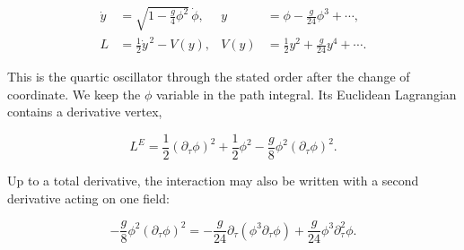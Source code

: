 \begin{equation}
 \begin{aligned}
 \dot y&=\sqrt{1-\frac{g}{4}\phi^2}\,\dot\phi,
 &y&=\phi-\frac{g}{24}\phi^3+\cdots,\\
 L&=\frac{1}{2}\dot y^{\,2}-V(y),
 &V(y)&=\frac{1}{2}y^2+\frac{g}{24}y^4+\cdots.
 \end{aligned}
 \label{eq:253a-coordinate-redefinition}
\end{equation}

This is the quartic oscillator through the stated order after the change of
coordinate. We keep the $\phi$ variable in the path integral. Its Euclidean
Lagrangian contains a derivative vertex,

\begin{equation}
 L^E=\frac{1}{2}(\partial_\tau\phi)^2+\frac{1}{2}\phi^2
 -\frac{g}{8}\phi^2(\partial_\tau\phi)^2.
 \label{eq:253a-derivative-euclidean-action}
\end{equation}

Up to a total derivative, the interaction may also be written with a second
derivative acting on one field:

\begin{equation}
 -\frac{g}{8}\phi^2(\partial_\tau\phi)^2
 =-\frac{g}{24}\partial_\tau(\phi^3\partial_\tau\phi)
 +\frac{g}{24}\phi^3\partial_\tau^2\phi.
 \label{eq:253a-derivative-integration-by-parts}
\end{equation}

